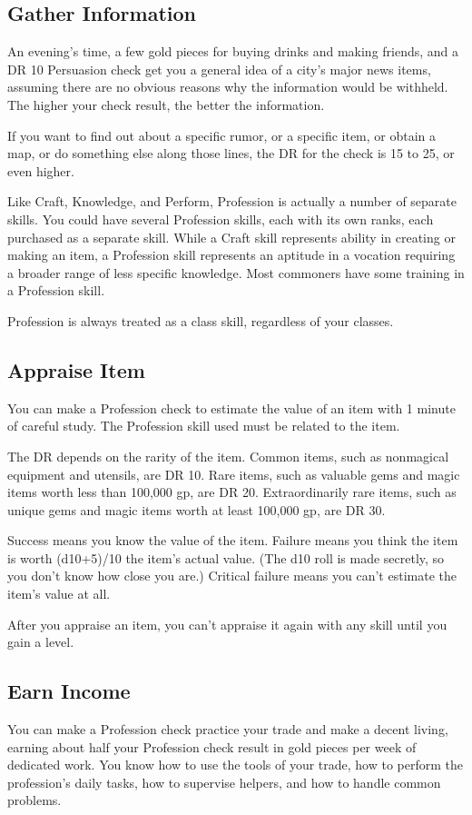     \subsection{Gather Information}
        An evening's time, a few gold pieces for buying drinks and making friends, and a DR 10 Persuasion check get you a general idea of a city's major news items, assuming there are no obvious reasons why the information would be withheld. The higher your check result, the better the information.

        If you want to find out about a specific rumor, or a specific item, or obtain a map, or do something else along those lines, the DR for the check is 15 to 25, or even higher.

        Like Craft, Knowledge, and Perform, Profession is actually a number of separate skills. You could have several Profession skills, each with its own ranks, each purchased as a separate skill. While a Craft skill represents ability in creating or making an item, a Profession skill represents an aptitude in a vocation requiring a broader range of less specific knowledge. Most commoners have some training in a Profession skill.

        Profession is always treated as a class skill, regardless of your classes.

    \subsection{Appraise Item}
        You can make a Profession check to estimate the value of an item with 1 minute of careful study. The Profession skill used must be related to the item.

        The DR depends on the rarity of the item. Common items, such as nonmagical equipment and utensils, are DR 10. Rare items, such as valuable gems and magic items worth less than 100,000 gp, are DR 20. Extraordinarily rare items, such as unique gems and magic items worth at least 100,000 gp, are DR 30.

        Success means you know the value of the item. Failure means you think the item is worth (d10+5)/10 \mtimes the item's actual value. (The d10 roll is made secretly, so you don't know how close you are.) Critical failure means you can't estimate the item's value at all.

        After you appraise an item, you can't appraise it again with any skill until you gain a level.

    \subsection{Earn Income}
        You can make a Profession check practice your trade and make a decent living, earning about half your Profession check result in gold pieces per week of dedicated work. You know how to use the tools of your trade, how to perform the profession's daily tasks, how to supervise helpers, and how to handle common problems.

